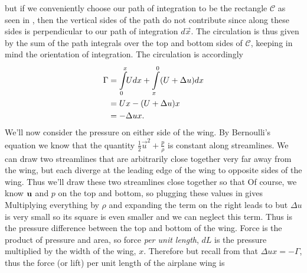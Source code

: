 \documentclass[12pt]{book}
\begin{document}
but if we conveniently choose our path of integration to be the rectangle $\mathcal C$ as seen in , then the vertical sides of the path do not contribute since along these sides \vecu is perpendicular to our path of integration $d\vec x$.  The circulation is thus given by the sum of the path integrals over the top and bottom sides of $\mathcal C$, keeping in mind the orientation of integration.  The circulation is accordingly
\begin{align}\Gamma &= \int\limits_{0}^{x}\!\!Udx + \int\limits_{x}^{0}(U+\Delta u)dx \notag\\
&= Ux - (U+\Delta u)x \notag\\ &= -\Delta u x \label{129834612341692384619283762193487623847}.\end{align}
We'll now consider the pressure on either side of the wing.  By Bernoulli's equation we know that the quantity $\frac{1}{2}\vec u^2 + \frac{p}{\rho}$ is constant along streamlines.  We can draw two streamlines that are arbitrarily close together very far away from the wing, but each diverge at the leading edge of the wing to opposite sides of the wing.  Thus we'll draw these two streamlines close together so that
Of course, we know $\mathbf{u}$ and $p$ on the top and bottom, so plugging these values in gives
Multiplying everything by $\rho$ and expanding the term on the right leads to
but $\Delta u$ is very small so its square is even smaller and we can neglect this term.  Thus
is the pressure difference between the top and bottom of the wing.  Force is the product of pressure and area, so force \textit{per unit length}, $dL$ is the pressure multiplied by the width of the wing, $x$.  Therefore
but recall from  that $\Delta u x = -\Gamma$, thus the force (or lift) per unit length of the airplane wing is
\end{document}
